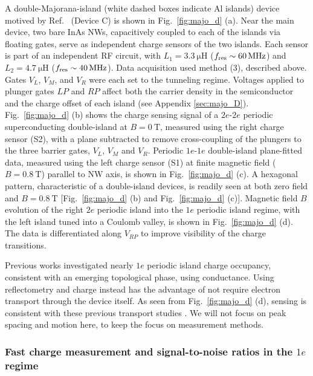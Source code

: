 A double-Majorana-island (white dashed boxes indicate Al islands) device motived by Ref.~\cite{AasenPRX16} (Device C) is shown in Fig.~\ref{fig:majo_d} (a). Near the main device, two bare InAs NWs, capacitively coupled to each of the islands via floating gates, serve as independent charge sensors of the two islands. Each sensor is part of an independent RF circuit, with $L_{1} = \SI{3.3}{\micro\henry}$ ($f_{\rm res} \sim \SI{60}{\mega\hertz}$) and $L_{2} = \SI{4.7}{\micro\henry}$ ($f_{\rm res} \sim \SI{40}{\mega\hertz}$). Data acquisition used method (3), described above. Gates $V_{L}$, $V_{M}$, and $V_{R}$ were each set to the tunneling regime. Voltages applied to plunger gates $LP$ and $RP$ affect both the carrier density in the semiconductor and the charge offset of each island (see Appendix \ref{sec:majo_D}). Fig.~\ref{fig:majo_d} (b) shows the charge sensing signal of a $2e$-$2e$ periodic superconducting double-island at $B = \SI{0}{\tesla}$, measured using the right charge sensor (S2), with a plane subtracted to remove cross-coupling of the plungers to the three barrier gates, $V_{L}$, $V_{M}$ and $V_{R}$.  Periodic $1e$-$1e$ double-island plane-fitted data, measured using the left charge sensor (S1) at finite magnetic field ($B = \SI{0.8}{\tesla}$) parallel to NW axis, is shown in Fig.~\ref{fig:majo_d} (c). A hexagonal pattern, characteristic of a double-island devices, is readily seen at both zero field and $B = \SI{0.8}{\tesla}$  [Fig.~\ref{fig:majo_d} (b) and Fig.~\ref{fig:majo_d} (c)]. Magnetic field $B$ evolution of the right $2e$ periodic island into the $1e$ periodic island regime, with the left island tuned into a Coulomb valley, is shown in Fig.~\ref{fig:majo_d} (d). The data is differentiated along $V_{RP}$ to improve visibility of the charge transitions.

Previous works \cite{AlbretchNature,sherman} investigated nearly $1e$ periodic island charge occupancy, consistent with an emerging topological phase, using conductance. Using reflectometry and charge instead has  the advantage of not require electron transport through the  device itself. As seen from Fig.~\ref{fig:majo_d} (d), sensing is consistent with these previous transport studies \cite{AlbretchNature}. We will not focus on peak spacing and motion here, to keep the focus on measurement methods.

\subsubsection{Fast charge measurement and signal-to-noise ratios in the \texorpdfstring{$1e$}{1e} regime}

